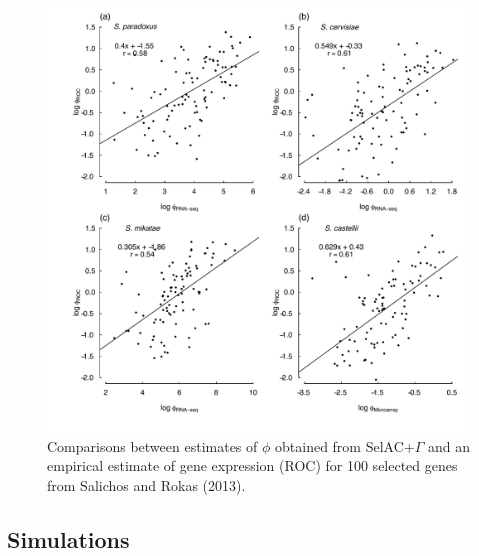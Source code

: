 \documentclass{article}
\begin{document}
\begin{figure}[H]
  \centering
  \includegraphics[width=0.9\linewidth]{FIGURE_S2_Empirical_vs_ROC_by_spp.pdf}
  \caption{Comparisons between estimates of $\phi$ obtained from SelAC+$\Gamma$ and an empirical estimate of gene expression (ROC) for 100 selected genes from Salichos and Rokas (2013).
  } 
  \label{fig:PhivsROC}
\end{figure}


\subsection*{Simulations}
\end{document}
